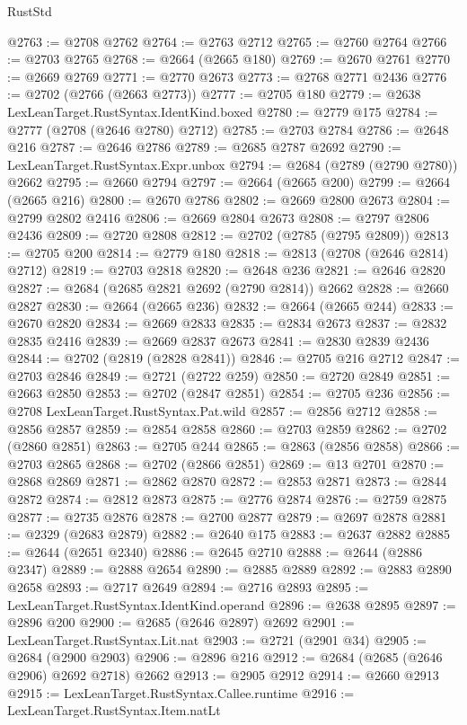 \begin{lexlean}{RustStd}
\begin{coremodule}
@2763 := @2708 @2762
@2764 := @2763 @2712
@2765 := @2760 @2764
@2766 := @2703 @2765
@2768 := @2664 (@2665 @180)
@2769 := @2670 @2761
@2770 := @2669 @2769
@2771 := @2770 @2673
@2773 := @2768 @2771 @2436
@2776 := @2702 (@2766 (@2663 @2773))
@2777 := @2705 @180
@2779 := @2638 LexLeanTarget.RustSyntax.IdentKind.boxed
@2780 := @2779 @175
@2784 := @2777 (@2708 (@2646 @2780) @2712)
@2785 := @2703 @2784
@2786 := @2648 @216
@2787 := @2646 @2786
@2789 := @2685 @2787 @2692
@2790 := LexLeanTarget.RustSyntax.Expr.unbox
@2794 := @2684 (@2789 (@2790 @2780)) @2662
@2795 := @2660 @2794
@2797 := @2664 (@2665 @200)
@2799 := @2664 (@2665 @216)
@2800 := @2670 @2786
@2802 := @2669 @2800 @2673
@2804 := @2799 @2802 @2416
@2806 := @2669 @2804 @2673
@2808 := @2797 @2806 @2436
@2809 := @2720 @2808
@2812 := @2702 (@2785 (@2795 @2809))
@2813 := @2705 @200
@2814 := @2779 @180
@2818 := @2813 (@2708 (@2646 @2814) @2712)
@2819 := @2703 @2818
@2820 := @2648 @236
@2821 := @2646 @2820
@2827 := @2684 (@2685 @2821 @2692 (@2790 @2814)) @2662
@2828 := @2660 @2827
@2830 := @2664 (@2665 @236)
@2832 := @2664 (@2665 @244)
@2833 := @2670 @2820
@2834 := @2669 @2833
@2835 := @2834 @2673
@2837 := @2832 @2835 @2416
@2839 := @2669 @2837 @2673
@2841 := @2830 @2839 @2436
@2844 := @2702 (@2819 (@2828 @2841))
@2846 := @2705 @216 @2712
@2847 := @2703 @2846
@2849 := @2721 (@2722 @259)
@2850 := @2720 @2849
@2851 := @2663 @2850
@2853 := @2702 (@2847 @2851)
@2854 := @2705 @236
@2856 := @2708 LexLeanTarget.RustSyntax.Pat.wild
@2857 := @2856 @2712
@2858 := @2856 @2857
@2859 := @2854 @2858
@2860 := @2703 @2859
@2862 := @2702 (@2860 @2851)
@2863 := @2705 @244
@2865 := @2863 (@2856 @2858)
@2866 := @2703 @2865
@2868 := @2702 (@2866 @2851)
@2869 := @13 @2701
@2870 := @2868 @2869
@2871 := @2862 @2870
@2872 := @2853 @2871
@2873 := @2844 @2872
@2874 := @2812 @2873
@2875 := @2776 @2874
@2876 := @2759 @2875
@2877 := @2735 @2876
@2878 := @2700 @2877
@2879 := @2697 @2878
@2881 := @2329 (@2683 @2879)
@2882 := @2640 @175
@2883 := @2637 @2882
@2885 := @2644 (@2651 @2340)
@2886 := @2645 @2710
@2888 := @2644 (@2886 @2347)
@2889 := @2888 @2654
@2890 := @2885 @2889
@2892 := @2883 @2890 @2658
@2893 := @2717 @2649
@2894 := @2716 @2893
@2895 := LexLeanTarget.RustSyntax.IdentKind.operand
@2896 := @2638 @2895
@2897 := @2896 @200
@2900 := @2685 (@2646 @2897) @2692
@2901 := LexLeanTarget.RustSyntax.Lit.nat
@2903 := @2721 (@2901 @34)
@2905 := @2684 (@2900 @2903)
@2906 := @2896 @216
@2912 := @2684 (@2685 (@2646 @2906) @2692 @2718) @2662
@2913 := @2905 @2912
@2914 := @2660 @2913
@2915 := LexLeanTarget.RustSyntax.Callee.runtime
@2916 := LexLeanTarget.RustSyntax.Item.natLt

\end{coremodule}
\end{lexlean}
